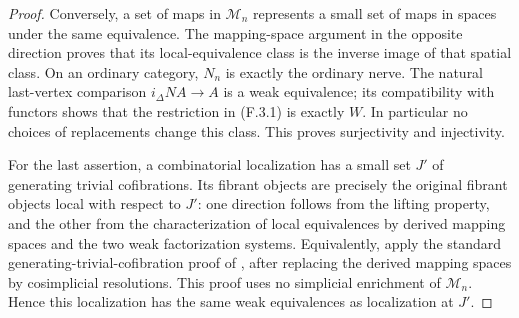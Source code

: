\begin{proof}
Conversely, a set of maps in $\mathcal M_n$ represents a small
set of maps in spaces under the same equivalence. The mapping-space
argument in the opposite direction proves that its local-equivalence
class is the inverse image of that spatial class. On an ordinary
category, $N_n$ is exactly the ordinary nerve. The natural
last-vertex comparison $i_\Delta NA\to A$ is a weak equivalence;
its compatibility with functors shows that the restriction in
(F.3.1) is exactly $W$. In particular no choices of replacements
change this class. This proves surjectivity and injectivity.

For the last assertion, a combinatorial localization has a small
set $J'$ of generating trivial cofibrations. Its fibrant objects
are precisely the original fibrant objects local with respect to
$J'$: one direction follows from the lifting property, and the
other from the characterization of local equivalences by derived
mapping spaces and the two weak factorization systems. Equivalently,
apply the standard generating-trivial-cofibration proof of
\cite[Proposition~A.3.7.4]{I_LurieHTT}, after replacing the derived
mapping spaces by cosimplicial resolutions. This proof uses no
simplicial enrichment of $\mathcal M_n$. Hence this localization
has the same weak equivalences as localization at $J'$.
\end{proof}

